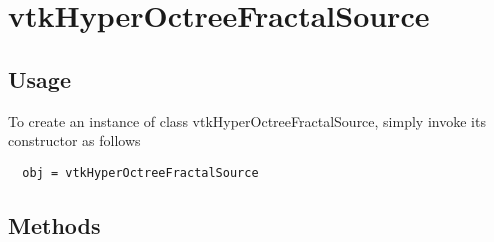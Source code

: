 \section{vtkHyperOctreeFractalSource}

\subsection{Usage}



To create an instance of class vtkHyperOctreeFractalSource, simply
invoke its constructor as follows
\begin{verbatim}
  obj = vtkHyperOctreeFractalSource
\end{verbatim}
\subsection{Methods}

